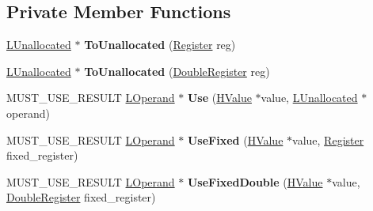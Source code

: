 \subsection*{Private Member Functions}
\begin{DoxyCompactItemize}
\item 
\hyperlink{classv8_1_1internal_1_1_l_unallocated}{L\+Unallocated} $\ast$ {\bfseries To\+Unallocated} (\hyperlink{structv8_1_1internal_1_1_register}{Register} reg)\hypertarget{classv8_1_1internal_1_1_l_chunk_builder_ad64c11bd8aaa0739948db677b925c63e}{}\label{classv8_1_1internal_1_1_l_chunk_builder_ad64c11bd8aaa0739948db677b925c63e}

\item 
\hyperlink{classv8_1_1internal_1_1_l_unallocated}{L\+Unallocated} $\ast$ {\bfseries To\+Unallocated} (\hyperlink{structv8_1_1internal_1_1_double_register}{Double\+Register} reg)\hypertarget{classv8_1_1internal_1_1_l_chunk_builder_a74c24db73a6aba0805f9297aff53a092}{}\label{classv8_1_1internal_1_1_l_chunk_builder_a74c24db73a6aba0805f9297aff53a092}

\item 
M\+U\+S\+T\+\_\+\+U\+S\+E\+\_\+\+R\+E\+S\+U\+LT \hyperlink{classv8_1_1internal_1_1_l_operand}{L\+Operand} $\ast$ {\bfseries Use} (\hyperlink{classv8_1_1internal_1_1_h_value}{H\+Value} $\ast$value, \hyperlink{classv8_1_1internal_1_1_l_unallocated}{L\+Unallocated} $\ast$operand)\hypertarget{classv8_1_1internal_1_1_l_chunk_builder_a714d648f4e1e137bd4525c985db04f99}{}\label{classv8_1_1internal_1_1_l_chunk_builder_a714d648f4e1e137bd4525c985db04f99}

\item 
M\+U\+S\+T\+\_\+\+U\+S\+E\+\_\+\+R\+E\+S\+U\+LT \hyperlink{classv8_1_1internal_1_1_l_operand}{L\+Operand} $\ast$ {\bfseries Use\+Fixed} (\hyperlink{classv8_1_1internal_1_1_h_value}{H\+Value} $\ast$value, \hyperlink{structv8_1_1internal_1_1_register}{Register} fixed\+\_\+register)\hypertarget{classv8_1_1internal_1_1_l_chunk_builder_ad3aa21f45609d65db9d8676440887bf7}{}\label{classv8_1_1internal_1_1_l_chunk_builder_ad3aa21f45609d65db9d8676440887bf7}

\item 
M\+U\+S\+T\+\_\+\+U\+S\+E\+\_\+\+R\+E\+S\+U\+LT \hyperlink{classv8_1_1internal_1_1_l_operand}{L\+Operand} $\ast$ {\bfseries Use\+Fixed\+Double} (\hyperlink{classv8_1_1internal_1_1_h_value}{H\+Value} $\ast$value, \hyperlink{structv8_1_1internal_1_1_double_register}{Double\+Register} fixed\+\_\+register)\hypertarget{classv8_1_1internal_1_1_l_chunk_builder_a29c9cf8ed3a82fbf1ecf09233168b692}{}\label{classv8_1_1internal_1_1_l_chunk_builder_a29c9cf8ed3a82fbf1ecf09233168b692}


\end{DoxyCompactItemize}
